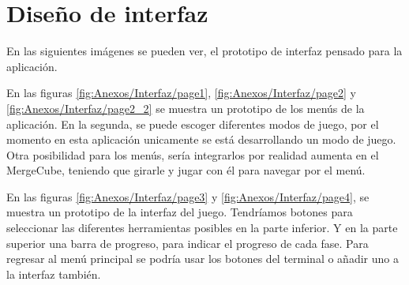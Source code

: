



\section{Diseño de interfaz}

En las siguientes imágenes se pueden ver, el prototipo de interfaz pensado para la aplicación. 

En las figuras \ref{fig:Anexos/Interfaz/page1}, \ref{fig:Anexos/Interfaz/page2} y \ref{fig:Anexos/Interfaz/page2_2} se muestra un prototipo de los menús de la aplicación. En la segunda, se puede escoger diferentes modos de juego, por el momento en esta aplicación unicamente se está desarrollando un modo de juego. 
Otra posibilidad para los menús, sería integrarlos por realidad aumenta en el MergeCube, teniendo que girarle y jugar con él para navegar por el menú.

En las figuras \ref{fig:Anexos/Interfaz/page3} y \ref{fig:Anexos/Interfaz/page4}, se muestra un prototipo de la interfaz del juego. Tendríamos botones para seleccionar las diferentes herramientas posibles en la parte inferior. Y en la parte superior una barra de progreso, para indicar el progreso de cada fase. Para regresar al menú principal se podría usar los botones del terminal o añadir uno a la interfaz también.





